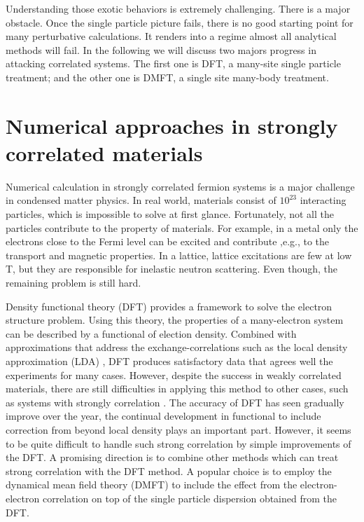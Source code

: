 Understanding those exotic behaviors is extremely challenging. There is a major
obstacle. Once the single particle picture fails, there
is no good starting point for many perturbative calculations. It renders
into a regime almost all analytical methods will fail. In the following we 
will discuss two majors progress in attacking correlated systems. The first one 
is DFT, a many-site single particle treatment; and the other one is DMFT, a single site 
many-body treatment. 

\section{Numerical approaches in strongly correlated materials}
Numerical calculation in strongly correlated fermion systems is a major 
challenge in condensed matter physics. In real world, materials consist of 
$10^{23}$ interacting particles, which is impossible to solve at first glance. 
Fortunately, not all the particles contribute to the property of materials. For 
example, in a metal only the electrons close to the Fermi level can be excited 
and contribute ,e.g., to the transport and magnetic properties. In a lattice, 
lattice excitations are few at low T, but they are responsible for inelastic 
neutron scattering. Even though, the remaining problem is still hard. 

Density functional theory (DFT)\cite{PhysRev.136.B864,PhysRev.140.A1133} 
provides a framework to solve the 
electron structure problem. Using this theory, the properties of a many-electron
system can be described by a functional of election density. Combined with 
approximations that address the exchange-correlations such as the local density 
approximation (LDA) \cite{lundqvist1983}, DFT produces satisfactory data that agrees well the 
experiments for many cases. However, despite the success in weakly correlated 
materials, there are still difficulties in applying this method to other 
cases, such as systems with strongly correlation \cite{0953-8984-9-35-010}. 
The accuracy of DFT has seen gradually improve over the year, the continual
development in functional to include correction from beyond local density 
plays an important part. However, it seems to be quite
difficult to handle such strong correlation by simple improvements of the 
DFT. A promising direction is to combine other methods which can treat
strong correlation with the DFT method. A popular choice is to employ 
the dynamical mean field theory\citep{RevModPhys.68.13,PhysRevB.45.6479} (DMFT)
to include the effect from the electron-electron
correlation on top of the single particle dispersion obtained from the DFT. 

